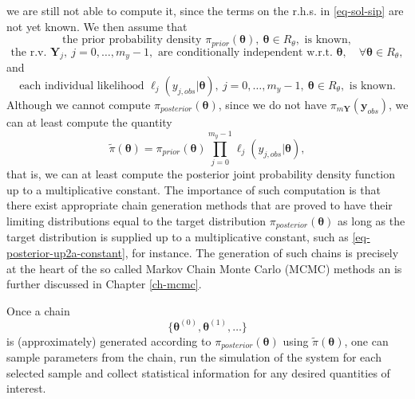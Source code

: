 we are still not able to compute it, since the terms on the r.h.s. in \eqref{eq-sol-sip} are not yet known.
We then assume that
\begin{equation}\label{eq-hyp-prior-known}
\mbox{the prior probability density }\pi_{prior}(\boldsymbol{\theta}),~\boldsymbol\theta\in R_{\theta},\mbox{ is known},
\end{equation}
\begin{equation}\label{eq-hyp-conditional-independence}
\mbox{the r.v. }\mathbf{Y}_j,~j=0,\ldots,m_y-1,\mbox{ are conditionally independent w.r.t. }\boldsymbol\theta,\quad\forall\boldsymbol\theta\in R_{\theta},
\end{equation}
and
\begin{equation}\label{eq-hyp-l-known}
\mbox{each individual likelihood }\ell_j(y_{j,obs}|\boldsymbol\theta),~j=0,\ldots,m_y-1,~\boldsymbol\theta\in R_{\theta},\mbox{ is known}.
\end{equation}
Although we cannot compute $\pi_{posterior}(\boldsymbol\theta)$,
since we do not have $\pi_{m\mathbf{Y}}(\mathbf{y}_{obs})$,
we can at least compute the quantity
\begin{equation}\label{eq-posterior-up2a-constant}
\tilde{\pi}(\boldsymbol\theta) =
{\pi_{prior}(\boldsymbol\theta)\prod_{j=0}^{m_y-1}\ell_j(y_{j,obs}|\boldsymbol\theta)},
\end{equation}
that is, we can at least compute the posterior joint probability density function up to a multiplicative constant.
The importance of such computation is that there exist
appropriate chain generation methods that are proved to have their limiting distributions equal 
to the target distribution $\pi_{posterior}(\boldsymbol\theta)$ as long as the target distribution is supplied
up to a multiplicative constant, such as \eqref{eq-posterior-up2a-constant}, for instance.
The generation of such chains is precisely at the heart of the so called Markov Chain Monte Carlo (MCMC) methods
an is further discussed in Chapter \ref{ch-mcmc}.

Once a chain
\begin{equation}\label{eq-markov-chain}
\{\boldsymbol{\theta}^{(0)},\boldsymbol{\theta}^{(1)},\ldots\}
\end{equation}
is (approximately) generated according to $\pi_{posterior}(\boldsymbol\theta)$ using $\tilde{\pi}(\boldsymbol\theta)$,
one can
sample parameters from the chain,
run the simulation of the system for each selected sample and
collect statistical information for any desired quantities of interest.

